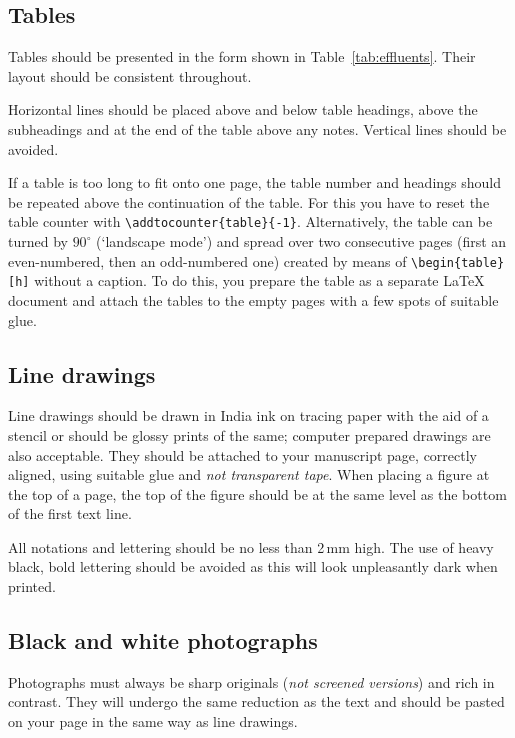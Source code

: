 \subsection{Tables}

Tables should be presented in the form shown in
Table~\ref{tab:effluents}.  Their layout should be consistent
throughout.

Horizontal lines should be placed above and below table headings, above
the subheadings and at the end of the table above any notes. Vertical
lines should be avoided.

If a table is too long to fit onto one page, the table number and
headings should be repeated above the continuation of the table. For
this you have to reset the table counter with
\verb|\addtocounter{table}{-1}|. Alternatively, the table can be turned
by $90^\circ$ (`landscape mode') and spread over two consecutive pages
(first an even-numbered, then an odd-numbered one) created by means of
\verb|\begin{table}[h]| without a caption. To do this, you prepare the
table as a separate \LaTeX{} document and attach the tables to the
empty pages with a few spots of suitable glue.

\subsection{Line drawings}

Line drawings should be drawn in India ink on tracing paper with the
aid of a stencil or should be glossy prints of the same; computer
prepared drawings are also acceptable. They should be attached to your
manuscript page, correctly aligned, using suitable glue and {\em not
transparent tape}. When placing a figure at the top of a page, the top
of the figure should be at the same level as the bottom of the first
text line.

All notations and lettering should be no less than 2\,mm high. The use
of heavy black, bold lettering should be avoided as this will look
unpleasantly dark when printed.

\subsection{Black and white photographs}

Photographs must always be sharp originals ({\em not screened
versions\/}) and rich in contrast. They will undergo the same reduction
as the text and should be pasted on your page in the same way as line
drawings.

